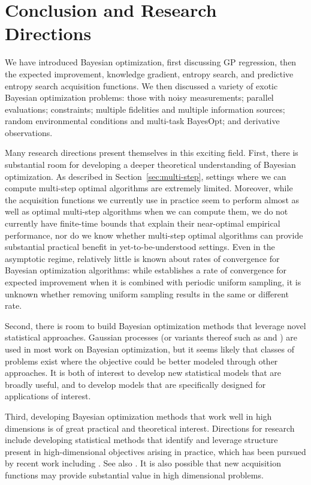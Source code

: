 \documentclass{article}
\begin{document}
\section{Conclusion and Research Directions}
\label{sec:conclusion}
We have introduced Bayesian optimization, first discussing GP regression, then the expected improvement, knowledge gradient, entropy search, and predictive entropy search acquisition functions.  We then discussed a variety of exotic Bayesian optimization problems: those with noisy measurements; parallel evaluations; constraints; multiple fidelities and multiple information sources; random environmental conditions and multi-task BayesOpt; and derivative observations.

Many research directions present themselves in this exciting field.
First, there is substantial room for developing a deeper theoretical understanding of Bayesian optimization.  As described in Section~\ref{sec:multi-step}, settings where we can compute multi-step optimal algorithms are extremely limited.  Moreover, while the acquisition functions we currently use in practice seem to perform almost as well as optimal multi-step algorithms when we can compute them, we do not currently have finite-time bounds that explain their near-optimal empirical performance, nor do we know whether multi-step optimal algorithms can provide substantial practical benefit in yet-to-be-understood settings.  Even in the asymptotic regime, relatively little is known about rates of convergence for Bayesian optimization algorithms: while \cite{bull2011convergence} establishes a rate of convergence for expected improvement when it is combined with periodic uniform sampling, it is unknown whether removing uniform sampling results in the same or different rate.

Second, there is room to build Bayesian optimization methods that leverage novel statistical approaches.  Gaussian processes (or variants thereof such as \cite{snoek2014input} and \cite{kersting2007most}) are used in most work on Bayesian optimization, but it seems likely that classes of problems exist where the objective could be better modeled through other approaches.  It is both of interest to develop new statistical models that are broadly useful, and to develop models that are specifically designed for applications of interest.

Third, developing Bayesian optimization methods that work well in high dimensions is of great practical and theoretical interest.  Directions for research include developing statistical methods that identify and leverage structure present in high-dimensional objectives arising in practice, which has been pursued by recent work including \cite{wang2013bayesian,wang2016bayesian,kandasamy2015high}.  See also \cite{shan2010survey}.
It is also possible that new acquisition functions may provide substantial value in high dimensional problems. 
\end{document}
